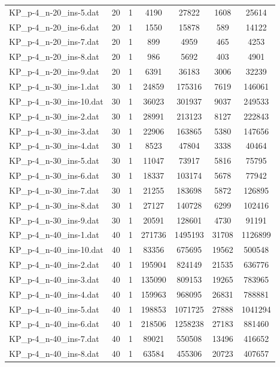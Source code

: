 \begin{table}[!ht]
\begin{tabular}{lcccccc}
KP\_p-4\_n-20\_ins-5.dat & 20 & 1 & 4190 & 27822 & 1608 & 25614 \\
KP\_p-4\_n-20\_ins-6.dat & 20 & 1 & 1550 & 15878 & 589 & 14122 \\
KP\_p-4\_n-20\_ins-7.dat & 20 & 1 & 899 & 4959 & 465 & 4253 \\
KP\_p-4\_n-20\_ins-8.dat & 20 & 1 & 986 & 5692 & 403 & 4901 \\
KP\_p-4\_n-20\_ins-9.dat & 20 & 1 & 6391 & 36183 & 3006 & 32239 \\
KP\_p-4\_n-30\_ins-1.dat & 30 & 1 & 24859 & 175316 & 7619 & 146061 \\
KP\_p-4\_n-30\_ins-10.dat & 30 & 1 & 36023 & 301937 & 9037 & 249533 \\
KP\_p-4\_n-30\_ins-2.dat & 30 & 1 & 28991 & 213123 & 8127 & 222843 \\
KP\_p-4\_n-30\_ins-3.dat & 30 & 1 & 22906 & 163865 & 5380 & 147656 \\
KP\_p-4\_n-30\_ins-4.dat & 30 & 1 & 8523 & 47804 & 3338 & 40464 \\
KP\_p-4\_n-30\_ins-5.dat & 30 & 1 & 11047 & 73917 & 5816 & 75795 \\
KP\_p-4\_n-30\_ins-6.dat & 30 & 1 & 18337 & 103174 & 5678 & 77942 \\
KP\_p-4\_n-30\_ins-7.dat & 30 & 1 & 21255 & 183698 & 5872 & 126895 \\
KP\_p-4\_n-30\_ins-8.dat & 30 & 1 & 27127 & 140728 & 6299 & 102416 \\
KP\_p-4\_n-30\_ins-9.dat & 30 & 1 & 20591 & 128601 & 4730 & 91191 \\
KP\_p-4\_n-40\_ins-1.dat & 40 & 1 & 271736 & 1495193 & 31708 & 1126899 \\
KP\_p-4\_n-40\_ins-10.dat & 40 & 1 & 83356 & 675695 & 19562 & 500548 \\
KP\_p-4\_n-40\_ins-2.dat & 40 & 1 & 195904 & 824149 & 21535 & 636776 \\
KP\_p-4\_n-40\_ins-3.dat & 40 & 1 & 135090 & 809153 & 19265 & 783965 \\
KP\_p-4\_n-40\_ins-4.dat & 40 & 1 & 159963 & 968095 & 26831 & 788881 \\
KP\_p-4\_n-40\_ins-5.dat & 40 & 1 & 198853 & 1071725 & 27888 & 1041294 \\
KP\_p-4\_n-40\_ins-6.dat & 40 & 1 & 218506 & 1258238 & 27183 & 881460 \\
KP\_p-4\_n-40\_ins-7.dat & 40 & 1 & 89021 & 550508 & 13496 & 416652 \\
KP\_p-4\_n-40\_ins-8.dat & 40 & 1 & 63584 & 455306 & 20723 & 407657 \\

\end{tabular}
\end{table}
